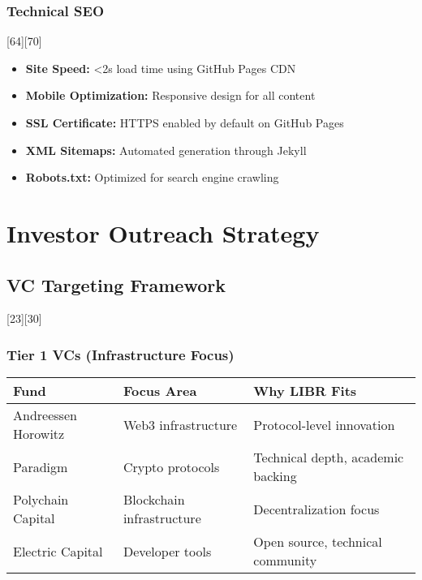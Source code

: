 \documentclass[12pt,a4paper]{article}
\begin{document}
\subsubsection{Technical SEO}[64][70]
\begin{itemize}
    \item \textbf{Site Speed:} <2s load time using GitHub Pages CDN
    \item \textbf{Mobile Optimization:} Responsive design for all content
    \item \textbf{SSL Certificate:} HTTPS enabled by default on GitHub Pages
    \item \textbf{XML Sitemaps:} Automated generation through Jekyll
    \item \textbf{Robots.txt:} Optimized for search engine crawling
\end{itemize}

\section{Investor Outreach Strategy}

\subsection{VC Targeting Framework}[23][30]

\subsubsection{Tier 1 VCs (Infrastructure Focus)}
\begin{center}
\begin{tabular}{|p{3cm}|p{3cm}|p{5cm}|}
\hline
\textbf{Fund} & \textbf{Focus Area} & \textbf{Why LIBR Fits} \\
\hline
Andreessen Horowitz & Web3 infrastructure & Protocol-level innovation \\
Paradigm & Crypto protocols & Technical depth, academic backing \\
Polychain Capital & Blockchain infrastructure & Decentralization focus \\
Electric Capital & Developer tools & Open source, technical community \\
\hline
\end{tabular}
\end{center}
\end{document}
